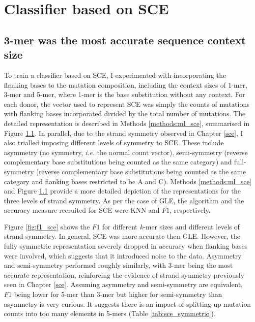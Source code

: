 

\section{Classifier based on SCE}\label{ml:sce}

\subsection{3-mer was the most accurate sequence context size}
To train a classifier based on SCE, I experimented with incorporating the flanking bases to the mutation composition, including the context sizes of 1-mer, 3-mer and 5-mer, where 1-mer is the base substitution without any context. For each donor, the vector used to represent SCE was simply the counts of mutations with flanking bases incorporated divided by the total number of mutations. The detailed representation is described in Methods \ref{methods:ml_sce}, summarised in Figure \ref{}. In parallel, due to the strand symmetry observed in Chapter \ref{sce}, I also trialled imposing different levels of symmetry to SCE. These include asymmetry (no symmetry, \textit{i.e.} the normal count vector), semi-symmetry (reverse complementary base substitutions being counted as the same category) and full-symmetry (reverse complementary base substitutions being counted as the same category and flanking bases restricted to be A and C). Methods \ref{methods:ml_sce} and Figure \ref{} provide a more detailed depiction of the representations for the three levels of strand symmetry. As per the case of GLE, the algorithm and the accuracy measure recruited for SCE were KNN and $F1$, respectively. 

Figure \ref{fig:f1_sce} shows the $F1$ for different $k$-mer sizes and different levels of strand symmetry. In general, SCE was more accurate then GLE. However, the fully symmetric representation severely dropped in accuracy when flanking bases were involved, which suggests that it introduced noise to the data. Asymmetry and semi-symmetry performed roughly similarly, with 3-mer being the most accurate representation, reinforcing the evidence of strand symmetry previously seen in Chapter \ref{sce}. Assuming asymmetry and semi-symmetry are equivalent, $F1$ being lower for 5-mer than 3-mer but higher for semi-symmetry than asymmetry is very curious. It suggests there is an impact of splitting up mutation counts into too many elements in 5-mers (Table \ref{tab:sce_symmetric}).



